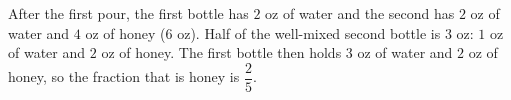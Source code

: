 After the first pour, the first bottle has $2$ oz of water and the second has $2$ oz of water and $4$ oz of honey ($6$ oz). Half of the well-mixed second bottle is $3$ oz: $1$ oz of water and $2$ oz of honey. The first bottle then holds $3$ oz of water and $2$ oz of honey, so the fraction that is honey is $\boxed{\dfrac{2}{5}}$.
